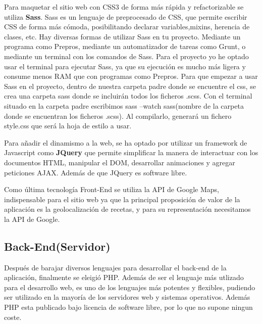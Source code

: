 \vspace{5 mm}

Para maquetar el sitio web con CSS3 de forma más rápida y refactorizable se utiliza \textbf{Sass}. Sass es un lenguaje de preprocesado de CSS, que permite escribir CSS de forma más cómoda, posibilitando declarar variables,mixins, herencia de clases, etc. Hay diversas formas de utilizar Sass en tu proyecto. Mediante un programa como Prepros, mediante un automatizador de tareas como Grunt, o mediante un terminal con los comandos de Sass. Para el proyecto yo he optado usar el terminal para ejecutar Sass, ya que su ejecución es mucho más ligera y consume menos RAM que con programas como Prepros. Para que empezar a usar Sass en el proyecto, dentro de nuestra carpeta padre donde se encuentre el css, se crea una carpeta sass donde se incluirán todos los ficheros .scss. Con el terminal situado en la carpeta padre escribimos sass --watch sass(nombre de la carpeta donde se encuentran los ficheros .scss). Al compilarlo, generará un fichero style.css que será la hoja de estilo a usar.

\vspace{5 mm}

Para añadir el dinamismo a la web, se ha optado por utilizar un framework de Javascript como \textbf{JQuery} que permite simplificar la manera de interactuar con los documentos HTML, manipular el DOM, desarrollar animaciones y agregar peticiones AJAX. Además de que JQuery es software libre.

\vspace{5 mm}

Como última tecnología Front-End se utiliza la API de Google Maps, indispensable para el sitio web ya que la principal proposición de valor de la aplicación es la geolocalización de recetas, y para su representación necesitamos la API de Google.


\subsection{Back-End(Servidor)}

Después de barajar diversos lenguajes para desarrollar el back-end de la aplicación, finalmente se eleigió PHP. Además de ser el lenguaje más utlizado para el desarrollo web, es uno de los lenguajes más potentes y flexibles, pudiendo ser utilizado en la mayoría de los servidores web y sistemas operativos. Además PHP esta publicado bajo licencia de software libre, por lo que no supone ningun coste.


